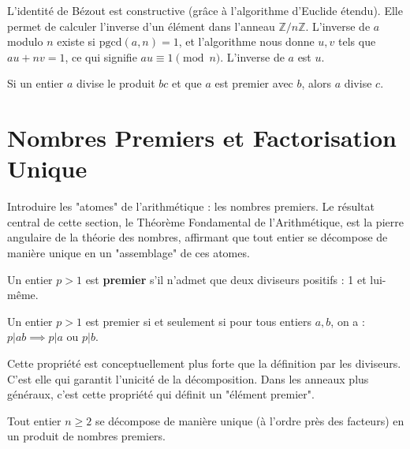 \begin{application}
    L'identité de Bézout est constructive (grâce à l'algorithme d'Euclide étendu). Elle permet de calculer l'inverse d'un élément dans l'anneau $\mathbb{Z}/n\mathbb{Z}$. L'inverse de $a$ modulo $n$ existe si $\mathrm{pgcd}(a,n)=1$, et l'algorithme nous donne $u,v$ tels que $au+nv=1$, ce qui signifie $au \equiv 1 \pmod n$. L'inverse de $a$ est $u$.
\end{application}

\begin{theorem}
    Si un entier $a$ divise le produit $bc$ et que $a$ est premier avec $b$, alors $a$ divise $c$.
\end{theorem}

\section{Nombres Premiers et Factorisation Unique}

\begin{objectif}
    Introduire les "atomes" de l'arithmétique : les nombres premiers. Le résultat central de cette section, le Théorème Fondamental de l'Arithmétique, est la pierre angulaire de la théorie des nombres, affirmant que tout entier se décompose de manière unique en un "assemblage" de ces atomes.
\end{objectif}

\begin{definition}
    Un entier $p > 1$ est \textbf{premier} s'il n'admet que deux diviseurs positifs : 1 et lui-même.
\end{definition}

\begin{lemma}
    Un entier $p > 1$ est premier si et seulement si pour tous entiers $a,b$, on a : $p|ab \implies p|a$ ou $p|b$.
\end{lemma}
\begin{remark}
    Cette propriété est conceptuellement plus forte que la définition par les diviseurs. C'est elle qui garantit l'unicité de la décomposition. Dans les anneaux plus généraux, c'est cette propriété qui définit un "élément premier".
\end{remark}

\begin{theorem}
    Tout entier $n \ge 2$ se décompose de manière unique (à l'ordre près des facteurs) en un produit de nombres premiers.
\end{theorem}

